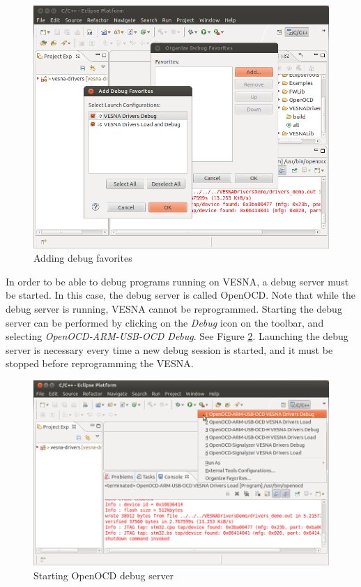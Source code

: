 \documentclass[a4paper, 10pt]{article}
\begin{document}
    \begin{figure}[H]
    \centering
        \includegraphics[width=\textwidth]{./install-guide-linux-images/debug-add-fav.png}
        \caption{Adding debug favorites}
        \label{fig:debug-add-fav}
    \end{figure}

In order to be able to debug programs running on VESNA,
a debug server must be started.
In this case, the debug server is called OpenOCD.
Note that while the debug server is running, VESNA cannot be reprogrammed.
Starting the debug server can be performed by clicking on the
\emph{Debug} icon on the toolbar, and selecting
\emph{OpenOCD-ARM-USB-OCD Debug}.
See Figure \ref{fig:debug-openocd-start}.
Launching the debug server is necessary every time a new debug session is started,
and it must be stopped before reprogramming the VESNA.

    \begin{figure}[H]
    \centering
        \includegraphics[width=\textwidth]{./install-guide-linux-images/debug-openocd-start.png}
        \caption{Starting OpenOCD debug server}
        \label{fig:debug-openocd-start}
    \end{figure}
\end{document}
